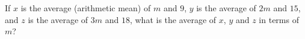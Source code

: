 If $x$ is the average (arithmetic mean) of $m$ and $9$, $y$ is the average of $2m$ and $15$, and $z$ is the average of $3m$ and $18$, what is the average of $x$, $y$ and $z$ in terms of $m$?
